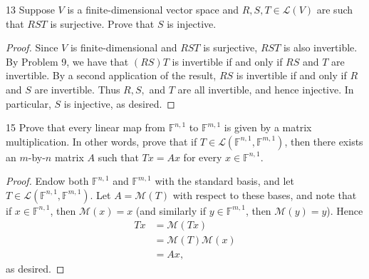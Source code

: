 \documentclass{extarticle}
\newenvironment{problem}[1]{\begin{prob*}{#1}{}}{\end{prob*}}
\newcommand{\F}{\mathbb{F}}
\newcommand{\mat}{\mathcal{M}}
\newcommand{\Hom}{\mathcal{L}}
\begin{document}
\begin{problem}{13}
Suppose $V$ is a finite-dimensional vector space and $R,S,T\in\Hom(V)$ are such that $RST$ is surjective.  Prove that $S$ is injective.
\end{problem}
\begin{proof}
Since $V$ is finite-dimensional and $RST$ is surjective, $RST$ is also invertible.  By Problem 9, we have that $(RS)T$ is invertible if and only if $RS$ and $T$ are invertible.  By a second application of the result, $RS$ is invertible if and only if $R$ and $S$ are invertible.  Thus $R,S,$ and $T$ are all invertible, and hence injective.  In particular, $S$ is injective, as desired.
\end{proof}

\begin{problem}{15}
Prove that every linear map from $\F^{n,1}$ to $\F^{m,1}$ is given by a matrix multiplication.  In other words, prove that if $T\in\Hom(\F^{n,1}, \F^{m,1})$, then there exists an $m$-by-$n$ matrix $A$ such that $Tx=Ax$ for every $x\in\F^{n,1}$.
\end{problem}
\begin{proof}
Endow both $\F^{n,1}$ and $\F^{m,1}$ with the standard basis, and let $T\in\Hom(\F^{n,1}, \F^{m,1})$.  Let $A=\mat(T)$ with respect to these bases, and note that if $x\in\F^{n,1}$, then $\mat(x) = x$ (and similarly if $y\in\F^{m,1}$, then $\mat(y) = y$).  Hence
\begin{align*}
Tx &= \mat(Tx)\\
&= \mat(T)\mat(x)\\
&= Ax,
\end{align*}
as desired.
\end{proof}
\end{document}
